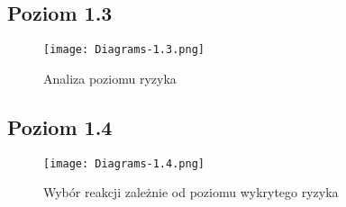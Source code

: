 \documentclass{article}
\begin{document}
\subsection{Poziom 1.3}
\begin{figure}[!htb]
\centering
\texttt{[image: Diagrams-1.3.png]}
\caption{Analiza poziomu ryzyka}
\end{figure}
\FloatBarrier
\clearpage

\subsection{Poziom 1.4}
\begin{figure}[!htb]
\centering
\texttt{[image: Diagrams-1.4.png]}
\caption{Wybór reakcji zależnie od poziomu wykrytego ryzyka}
\end{figure}
\FloatBarrier
\clearpage
\end{document}
